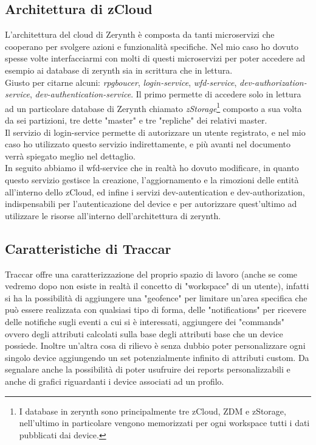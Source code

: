 \documentclass[a4paper,titlepage,12pt]{book}
\begin{document}
{\subsection{
 Architettura di zCloud}
L'architettura del cloud di Zerynth è composta da tanti microservizi che cooperano per svolgere azioni e funzionalità specifiche. Nel mio caso ho dovuto spesse volte interfacciarmi con molti di questi microservizi per poter accedere ad esempio ai database di zerynth sia in scrittura che in lettura. \\
Giusto per citarne alcuni: \textit{rpgboucer}, \textit{login-service}, \textit{wfd-service}, \textit{dev-authorization-service}, \textit{dev-authentication-service}. Il primo permette di accedere solo in lettura ad un particolare database di Zerynth chiamato \textit{zStorage}\footnote{
I database in zerynth sono principalmente tre zCloud, ZDM e zStorage, nell'ultimo in particolare vengono memorizzati per ogni workspace tutti i dati pubblicati dai device.} composto a sua volta da sei partizioni, tre dette "master" e tre "repliche" dei relativi master.\\
Il servizio di login-service permette di autorizzare un utente registrato, e nel mio caso ho utilizzato questo servizio indirettamente, e più avanti nel documento verrà spiegato meglio nel dettaglio.\\
In seguito abbiamo il wfd-service che in realtà ho dovuto modificare, in quanto questo servizio gestisce la creazione, l'aggiornamento e la rimozioni delle entità all'interno dello zCloud, ed infine i servizi dev-autentication e dev-authorization, indispensabili per l'autenticazione del device e per autorizzare quest'ultimo ad utilizzare le risorse all'interno dell'architettura di zerynth.

\subsection{
Caratteristiche di Traccar}
Traccar offre una caratterizzazione del proprio spazio di lavoro (anche se come vedremo dopo non esiste in realtà il concetto di "workspace" di un utente), infatti si ha la possibilità di aggiungere una "geofence" per limitare un'area specifica che può essere realizzata con qualsiasi tipo di forma, delle "notifications" per ricevere delle notifiche sugli eventi a cui si è interessati, aggiungere dei "commands" ovvero degli attributi calcolati sulla base degli attributi base che un device possiede. Inoltre un'altra cosa di rilievo è senza dubbio poter personalizzare ogni singolo device aggiungendo un set potenzialmente infinito di attributi custom. Da segnalare anche la possibilità di poter usufruire dei reports personalizzabili e anche di grafici riguardanti i device associati ad un profilo. \\

}
\end{document}
